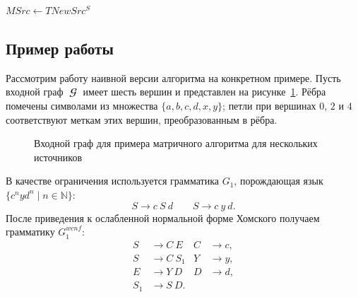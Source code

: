 \begin{algorithm}
    $MSrc \gets TNewSrc^S$\;
    \;
    \caption{Матричный алгоритм КС-достижимости для нескольких источников с кэшированием}
    \label{algo:MatrixMultiSourceCache}
\end{algorithm}

\subsection{Пример работы}
\label{subsec:CFPQ_MatrixMultiSource_example}

Рассмотрим работу наивной версии алгоритма на конкретном примере.
Пусть входной граф $\mbfscrG$ имеет шесть вершин и представлен на рисунке~\ref{fig:MatrixMultiSource_input_graph}.
Рёбра помечены символами из множества $\{a, b, c, d, x, y\}$; петли при вершинах $0$, $2$ и $4$ соответствуют меткам этих вершин, преобразованным в рёбра.

\begin{figure}
    \centering
    
    \caption{Входной граф для примера матричного алгоритма для нескольких источников}
    \label{fig:MatrixMultiSource_input_graph}
\end{figure}

В качестве ограничения используется грамматика $G_1$, порождающая язык $\{c^n y d^n \mid n \in \mathbb{N}\}$:
\[
    S \to c\ S\ d \qquad S \to c\ y\ d.
\]
После приведения к ослабленной нормальной форме Хомского получаем грамматику $G_1^{\mathit{wcnf}}$:
\begin{align*}
    S   &\to C\ E    & C &\to c, \\
    S   &\to C\ S_1  & Y &\to y, \\
    E   &\to Y\ D    & D &\to d, \\
    S_1 &\to S\ D.   &   &
\end{align*}


